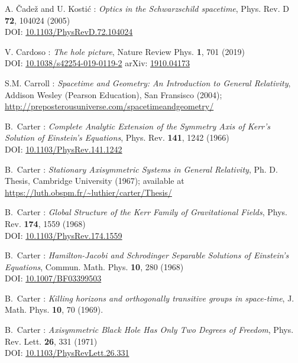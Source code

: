 \begin{thebibliography}{123}
A. \v{C}ade\v{z} and U. Kosti\'c :
{\em Optics in the Schwarzschild spacetime},
Phys. Rev. D {\bf 72}, 104024 (2005)\\
DOI: \href{https://doi.org/10.1103/PhysRevD.72.104024}{10.1103/PhysRevD.72.104024}

V. Cardoso :
{\em The hole picture},
Nature Review Phys. {\bf 1}, 701 (2019)\\
DOI: \href{https://doi.org/10.1038/s42254-019-0119-2}{10.1038/s42254-019-0119-2}\hfill
arXiv: \href{https://arxiv.org/abs/1910.04173}{1910.04173}

S.M. Carroll : \emph{Spacetime and Geometry: An Introduction to General Relativity},
Addison Wesley (Pearson Education), San Fransisco (2004); \\
\url{http://preposterousuniverse.com/spacetimeandgeometry/}

B.~Carter :
{\em Complete Analytic Extension of the Symmetry Axis of Kerr's Solution of Einstein's Equations},
Phys. Rev. {\bf 141}, 1242 (1966)\\
DOI: \href{https://doi.org/10.1103/PhysRev.141.1242}{10.1103/PhysRev.141.1242}

B.~Carter : {\em Stationary Axisymmetric Systems in General Relativity},
Ph. D. Thesis, Cambridge University (1967); available at\\
\url{https://luth.obspm.fr/~luthier/carter/Thesis/}

B.~Carter :
{\em Global Structure of the Kerr Family of Gravitational Fields},
Phys. Rev. {\bf 174}, 1559 (1968)\\
DOI: \href{https://doi.org/10.1103/PhysRev.174.1559}{10.1103/PhysRev.174.1559}

B.~Carter :
{\em Hamilton-Jacobi and Schrodinger Separable Solutions of Einstein's Equations},
Commun. Math. Phys. {\bf 10}, 280 (1968)\\
DOI: \href{https://doi.org/10.1007/BF03399503}{10.1007/BF03399503}

B.~Carter : {\em Killing horizons and orthogonally transitive groups
in space-time},
J. Math. Phys. {\bf 10}, 70 (1969).

B.~Carter : {\em Axisymmetric Black Hole Has Only Two Degrees of Freedom},
Phys. Rev. Lett. {\bf 26}, 331 (1971)\\
DOI: \href{https://doi.org/10.1103/PhysRevLett.26.331}{10.1103/PhysRevLett.26.331}


\end{thebibliography}
